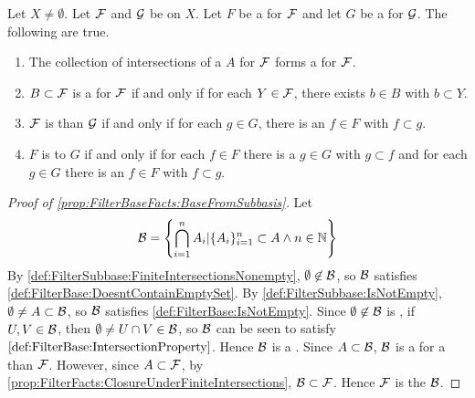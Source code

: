 \begin{prop}[FilterBaseFacts]
\label{prop:FilterBaseFacts}
   Let $X \neq \emptyset$. 
   Let $\mathcal{F}$ and $\mathcal{G}$ be \Filters on $X$. 
   Let $F$ be a \FilterBase for $\mathcal{F}$ and let 
   $G$ be a \FilterBase for $\mathcal{G}$. 
   The following are true. 
   \begin{enumerate}[label=(\roman*), ref={\ref{prop:FilterBaseFacts}.~\roman*}]
    \item \label{prop:FilterBaseFacts:BaseFromSubbasis}
        The collection of \Finite intersections of a 
        \FilterSubbasis $A$ for $\mathcal{F}$ 
        forms a \FilterBase for $\mathcal{F}$. 
    \item \label{prop:FilterBaseFacts:BaseCondition}
    $B \subset \mathcal{F}$ is a \FilterBase for $\mathcal{F}$ 
    if and only if for each $Y \in \mathcal{F}$, there exists
    $b \in B$ with $b \subset Y$. 
    \item \label{prop:FilterBaseFacts:FinerCondition}
       $\mathcal{F}$ 
       is \FinerFilter than $\mathcal{G}$ if and only if
       for each $g \in G$, there is an $f \in F$ with $f \subset g$. 
    \item  \label{prop:FilterBaseFact:EquivalenceCondition} 
    $F$ is 
    \FilterBaseEquivalent to 
    $G$ if and only if for each 
    $f \in F$ there  is a 
    $g \in G$ with $g \subset f$ 
    and for each $g \in G$ there is an 
    $f \in F$ with $f \subset g$. 
   \end{enumerate}
   \begin{proof}[Proof of \ref{prop:FilterBaseFacts:BaseFromSubbasis}]
   Let 
   \begin{equation}
    \mathcal{B} = \left\{ \bigcap\limits_{i=1}^n A_i | \{A_i\}_{i=1}^n \subset A \wedge n \in \mathbb{N}\right\}
   \end{equation}
   By \ref{def:FilterSubbase:FiniteIntersectionsNonempty}, $\emptyset \not \in \mathcal{B}$, so $\mathcal{B}$ satisfies \ref{def:FilterBase:DoesntContainEmptySet}. 
   By \ref{def:FilterSubbase:IsNotEmpty}, $\emptyset \neq A \subset \mathcal{B}$, so $\mathcal{B}$ satisfies \ref{def:FilterBase:IsNotEmpty}. 
   Since $\emptyset \not \in \mathcal{B}$ is \ClosedUnderFiniteIntersections, if $U,V \in \mathcal{B}$, then $\emptyset \neq U \cap V \in \mathcal{B}$, so $\mathcal{B}$ can be seen to satisfy $\ref{def:FilterBase:IntersectionProperty}$. Hence $\mathcal{B}$ is a \FilterBase. 
   Since $A \subset \mathcal{B}$, $\mathcal{B}$ is a \FilterBase for a \FinerFilter than $\mathcal{F}$. 
   However, since $A \subset \mathcal{F}$, 
   by \ref{prop:FilterFacts:ClosureUnderFiniteIntersections}, $\mathcal{B} \subset \mathcal{F}$. 
   Hence $\mathcal{F}$ is the \Filter
   \FilterGeneratedBy $\mathcal{B}$. 
   \end{proof}

\end{prop}
